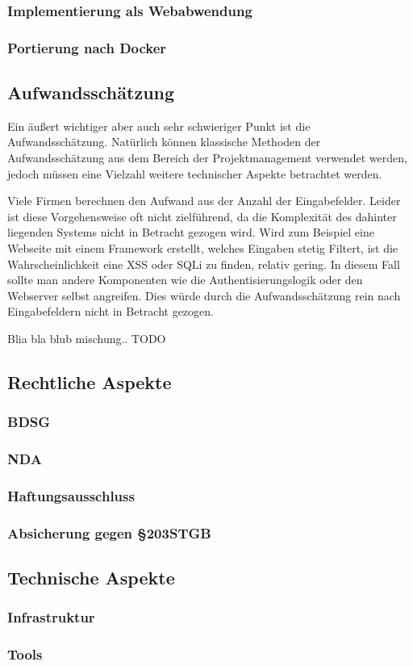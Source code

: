 \subsubsection{Implementierung als Webabwendung}

\subsubsection{Portierung nach Docker}

	\subsection{Aufwandsschätzung}
	Ein äußert wichtiger aber auch sehr schwieriger Punkt ist die Aufwandsschätzung. Natürlich können klassische Methoden der Aufwandsschätzung aus dem Bereich der Projektmanagement verwendet werden, jedoch müssen eine Vielzahl weitere technischer Aspekte betrachtet werden.
	
	Viele Firmen berechnen den Aufwand aus der Anzahl der Eingabefelder. Leider ist diese Vorgehensweise oft nicht zielführend, da die Komplexität des dahinter liegenden Systems nicht in Betracht gezogen wird. Wird zum Beispiel eine Webseite mit einem Framework erstellt, welches Eingaben stetig Filtert, ist die Wahrscheinlichkeit eine XSS oder SQLi zu finden, relativ gering. In diesem Fall sollte man andere Komponenten wie die Authentisierungslogik oder den Webserver selbst angreifen. Dies würde durch die Aufwandsschätzung rein nach Eingabefeldern nicht in Betracht gezogen.
	
	Blia bla blub mischung.. TODO
		
		
	\subsection{Rechtliche Aspekte}
		\subsubsection{BDSG}
		\subsubsection{NDA}
		\subsubsection{Haftungsausschluss}
		\subsubsection{Absicherung gegen §203STGB}
	\subsection{Technische Aspekte}
		\subsubsection{Infrastruktur}
		\subsubsection{Tools}